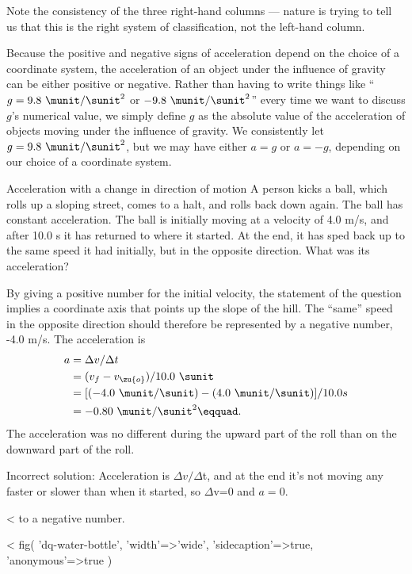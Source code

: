 \noindent Note the consistency of the three right-hand columns ---
nature is trying to tell us that this is the right system of
classification, not the left-hand column.

Because the positive and negative signs of acceleration
depend on the choice of a coordinate system, the acceleration
of an object under the influence of gravity can be either
positive or negative. Rather than having to write things
like ``$g=9.8\ \munit/\sunit^2$ or $-9.8\ \munit/\sunit^2$''
every time we want to
discuss $g$'s numerical value, we simply define $g$ as the
absolute value of the acceleration of objects moving under
the influence of gravity. We consistently let $g=9.8 \ \munit/\sunit^2$,
but we may have either $a=g$ or $a=-g$, depending on our
choice of a coordinate system.

\begin{eg}{Acceleration with a change in direction of motion}
\egquestion A person kicks a ball, which rolls up a sloping
street, comes to a halt, and rolls back down again. The ball
has constant acceleration. The ball is initially moving at a
velocity of 4.0 m/s, and after 10.0 s it has returned to
where it started. At the end, it has sped back up to the
same speed it had initially, but in the opposite direction.
What was its acceleration?

\eganswer By giving a positive number for the initial
velocity, the statement of the question implies a coordinate
axis that points up the slope of the hill. The ``same''
speed in the opposite direction should therefore be
represented by a negative number, -4.0 m/s. The acceleration
is
\begin{align*}
  a &= \Delta v/\Delta t \\
    &= (v_f-v_\zu{o})/10.0\ \sunit \\
    &= [(-4.0 \ \munit/\sunit)-(4.0 \ \munit/\sunit)]/10.0 s \\
    &= -0.80\ \munit/\sunit^2\eqquad.
\end{align*}
The
acceleration was no different during the upward part of the
roll than on the downward part of the roll.

Incorrect solution: Acceleration is $\Delta v/\Delta $t, and
at the end it's not moving any faster or slower than when it
started, so $\Delta $v=0 and $a=0$.

\noindent<%
to a negative number.
\end{eg}

<%
  fig(
    'dq-water-bottle',
    {
      'width'=>'wide',
      'sidecaption'=>true,
      'anonymous'=>true
    }
  )

